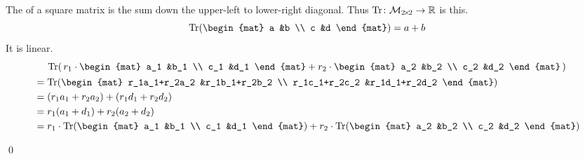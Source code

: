 \documentclass[10pt,t]{beamer}
\begin{document}
\begin{frame}
\ex
The  of a square matrix 
is the sum down the upper-left to lower-right diagonal.
Thus
$\mbox{$\operatorname{Tr}\colon \mathcal{M}_{2 \! \times \! 2}\to \mathbb{R}$}$
is this.
\begin{equation*}
  \trace(\begin{mat}
    a &b \\
    c &d
  \end{mat})
  =a+b
\end{equation*}
It is linear.
\begin{multline*}
  \trace(\,
  r_1\cdot\begin{mat}
    a_1 &b_1 \\
    c_1 &d_1
  \end{mat}
  +
  r_2\cdot\begin{mat}
    a_2 &b_2 \\
    c_2 &d_2
  \end{mat}
  \,)                                              \\
  \begin{aligned}
    &=\trace(
      \begin{mat}
        r_1a_1+r_2a_2 &r_1b_1+r_2b_2 \\
        r_1c_1+r_2c_2 &r_1d_1+r_2d_2
      \end{mat}
      )                                       \\
    &=(r_1a_1+r_2a_2)+(r_1d_1+r_2d_2)         \\
    &=r_1(a_1+d_1)+r_2(a_2+d_2)               \\
    &=r_1\cdot\trace(
      \begin{mat}
        a_1 &b_1 \\
        c_1 &d_1
      \end{mat}
      )
      +
      r_2\cdot\trace(
      \begin{mat}
        a_2 &b_2 \\
        c_2 &d_2
      \end{mat}
      )
  \end{aligned} 
\end{multline*}
\end{frame}



\begin{frame}
\th[th:HomoDetActOnBasis]

\pause
\pf
{}

\pause
{}
\end{frame}
\begin{frame}
\qed

\pause %
\df[df:ExtendedLinearly]
\end{frame}
\end{document}
